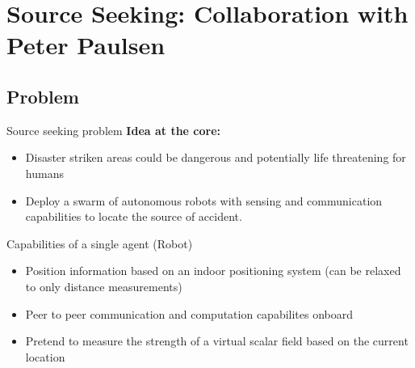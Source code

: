 \section{Source Seeking: Collaboration with Peter Paulsen}
\subsection{Problem}
\begin{frame}{Source seeking problem}
\vspace{0.5cm}
\textbf{Idea at the core:}
\begin{itemize}
	\item Disaster striken areas could be dangerous and potentially life threatening for humans 
	\item Deploy a swarm of autonomous robots with sensing and communication capabilities to locate the source of accident.
\end{itemize}
\end{frame}
\begin{frame}{Capabilities of a single agent (Robot)}
\begin{itemize}
	\item Position information based on an indoor positioning system (can be relaxed to only distance measurements)
	\item Peer to peer communication and computation capabilites onboard
	\item Pretend to measure the strength of a virtual scalar field based on the current location
\end{itemize}		
\end{frame}
